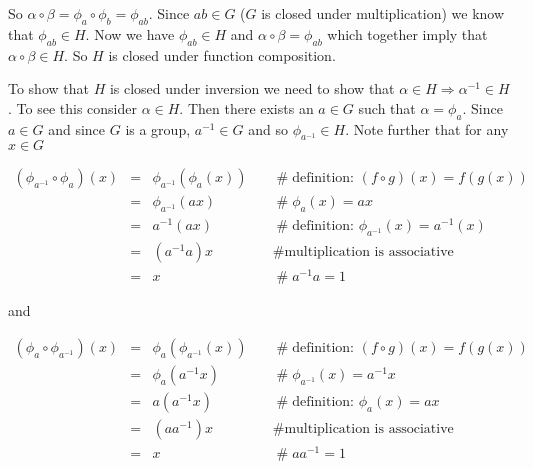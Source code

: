 \documentclass{article}
\theoremstyle{definition}
\begin{document}
\bigskip
\noindent
So $\alpha \circ \beta = \phi_a \circ \phi_b = \phi_{ab}$. Since
$ab \in G$ ($G$ is closed under multiplication) we know that
$\phi_{ab} \in H$. Now we have $\phi_{ab} \in H$ and $\alpha
\circ \beta = \phi_{ab}$ which together imply that $\alpha \circ
\beta \in H$. So $H$ is closed under function composition.

\bigskip
\noindent
To show that $H$ is closed under inversion we need to show that
$\alpha \in H \Rightarrow \alpha^{-1} \in H$.  To see this
consider $\alpha \in H$.  Then there exists an $a \in G$ such
that $\alpha = \phi_a$.  Since $a \in G$ and since $G$ is a
group, $a^{-1} \in G$ and so $\phi_{a^{-1}} \in H$. Note further
that for any $x \in G$

\bigskip
\begin{equation}
\begin{array}{rcll}
(\phi_{a^{-1}} \circ \phi_a)(x)
&=& \phi_{a^{-1}}(\phi_a(x))    &\quad  \mathrel{\#} \text{definition: $(f \circ g)(x) = f(g(x))$} \\
&=& \phi_{a^{-1}}(ax)           &\quad  \mathrel{\#} \phi_a(x) = ax \\
&=& a^{-1}(ax)                  &\quad  \mathrel{\#} \text{definition: } \phi_{a^{-1}}(x) = a^{-1}(x) \\
&=& (a^{-1}a)x                  &\quad  \mathrel{\#} \text{multiplication is associative} \\
&=& x                           &\quad  \mathrel{\#} a^{-1}a = 1
\end{array}
\label{eqn:comp1}
\end{equation}


\bigskip
\noindent
and  

\bigskip
\begin{equation}
\begin{array}{rcll}
(\phi_{a} \circ \phi_{a^{-1}})(x)
&=& \phi_{a}(\phi_{a^{-1}}(x))  &\quad  \mathrel{\#} \text{definition: $(f \circ g)(x) = f(g(x))$} \\
&=& \phi_{a}(a^{-1}x)           &\quad  \mathrel{\#} \phi_{a^{-1}}(x) = a^{-1}x \\
&=& a(a^{-1}x)                  &\quad  \mathrel{\#} \text{definition: }  \phi_{a}(x) = ax \\
&=& (a a^{-1})x                 &\quad  \mathrel{\#} \text{multiplication is associative} \\
&=& x                           &\quad  \mathrel{\#} aa^{-1} = 1
\end{array}
\label{eqn:comp2}
\end{equation}
\end{document}
